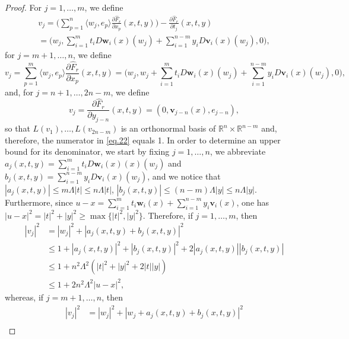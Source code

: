 \documentclass[11pt]{article}
\theoremstyle{definition}
\theoremstyle{jepanonymous}
\theoremstyle{plain}
\newcommand{\R}{\mathbb{R}}
\newcommand{\Rn}{\R^n}
\newcommand{\bv}{{\boldsymbol{v}}}
\newcommand{\bw}{{\boldsymbol{w}}}
\let\la\langle
\let\ra\rangle
\begin{document}
\begin{proof}
For $j=1,\ldots,m$, we define\vspace*{-3pt}
\begin{multline*}
v_j = \biggl(\sum_{p=1}^n \la w_j, e_p \ra \frac{\partial \hat{F}_r}{\partial x_p}(x,t,y)\biggr) - \frac{\partial \hat{F}_r}{\partial t_j}(x,t,y)
\\[-5pt]
= \biggl(w_j, \sum_{i=1}^m t_i D\bw_i(x)(w_j) + \sum_{i=1}^{n-m} y_i D\bv_i(x)(w_j), 0 \biggr),
\end{multline*}
for $j=m+1,\ldots,n$, we define
\begin{equation*}
v_j = \sum_{p=1}^m \la w_j, e_p \ra \frac{\partial \hat{F}_r}{\partial x_p}(x,t,y)
= \biggl(w_j, w_j + \sum_{i=1}^m t_i D\bw_i(x)(w_j) + \sum_{i=1}^{n-m} y_i D\bv_i(x)(w_j), 0 \biggr),
\end{equation*}
and, for $j=n+1,\ldots,2n-m$, we define\vspace*{-3pt}
\begin{equation*}
v_j = \frac{\partial \hat{F}_r}{\partial y_{j-n}}(x,t,y) = (0, \bv_{j-n}(x),e_{j-n}),
\end{equation*}
so that $L(v_1),\ldots,L(v_{2n-m})$ is an orthonormal basis of $\Rn \times \R^{n-m}$ and, therefore, the numerator in \eqref{eq.22} equals 1.
In order to determine an upper bound for its denominator, we start by fixing $j=1,\ldots,n$, we abbreviate $a_j(x,t,y) = \sum_{i=1}^m t_i D\bw_i(x)(x)(w_j)$ and $b_j(x,t,y) = \sum_{i=1}^{n-m} y_i D\bv_i(x)(w_j)$, and we notice that $|a_j(x,t,y)| \leq m \Lambda |t| \leq n \Lambda |t|$, $|b_j(x,t,y)| \leq (n-m) \Lambda |y| \leq n \Lambda |y|$.
Furthermore, since $u - x = \sum_{i=1}^m t_i \bw_i(x) + \sum_{i=1}^{n-m} y_i \bv_i(x)$, one has $|u-x|^2 = |t|^2 + |y|^2 \geq \max \{|t|^2,|y|^2\}$.
Therefore, if $j=1,\ldots,m$, then
\begin{equation*}
\begin{split}
|v_j|^2 & = |w_j|^2 + \left| a_j(x,t,y) + b_j(x,t,y) \right|^2 \\
& \leq 1 + \left|a_j(x,t,y)\right|^2 + \left|b_j(x,t,y)\right|^2 + 2 \left|a_j(x,t,y)\right| \left|b_j(x,t,y)\right| \\
& \leq 1 + n^2 \Lambda^2 \left(|t|^2 + |y|^2 + 2 |t| |y|\right) \\
& \leq 1 + 2 n^2 \Lambda^2 |u-x|^2,
\end{split}
\end{equation*}
whereas, if $j=m+1,\ldots,n$, then
\begin{equation*}
\begin{split}
\left| v_j\right|^2 &= |w_j|^2 + |w_j + a_j(x,t,y) + b_j(x,t,y)|^2 \\

\end{split}
\end{equation*}
\end{proof}
\end{document}
